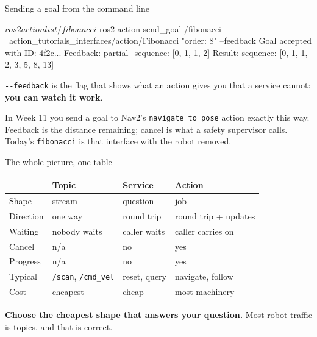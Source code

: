 \documentclass[aspectratio=169]{beamer}
\begin{document}
\begin{frame}[fragile]{Sending a goal from the command line}
  \begin{shells}
$ ros2 action list
/fibonacci
$ ros2 action send_goal /fibonacci \
      action_tutorials_interfaces/action/Fibonacci "{order: 8}" --feedback
Goal accepted with ID: 4f2c...
Feedback: partial_sequence: [0, 1, 1, 2]
Result: sequence: [0, 1, 1, 2, 3, 5, 8, 13]
  \end{shells}

  \footnotesize
  \texttt{-{}-feedback} is the flag that shows what an action gives you that a service cannot:
  \textbf{you can watch it work}.

  \begin{inthefield}
    \footnotesize
    In Week 11 you send a goal to Nav2's \texttt{navigate\_to\_pose} action exactly this way.
    Feedback is the distance remaining; cancel is what a safety supervisor calls. Today's
    \texttt{fibonacci} is that interface with the robot removed.
  \end{inthefield}
\end{frame}

\begin{frame}{The whole picture, one table}
  \small
  \begin{center}
  \begin{tabular}{@{}p{1.7cm}p{2.4cm}p{2.4cm}p{3.6cm}@{}}
    \toprule
    & \textbf{Topic} & \textbf{Service} & \textbf{Action} \\
    \midrule
    Shape & stream & question & job \\[0.25em]
    Direction & one way & round trip & round trip + updates \\[0.25em]
    Waiting & nobody waits & caller waits & caller carries on \\[0.25em]
    Cancel & n/a & no & yes \\[0.25em]
    Progress & n/a & no & yes \\[0.25em]
    Typical & \texttt{/scan}, \texttt{/cmd\_vel} & reset, query & navigate, follow \\[0.25em]
    Cost & cheapest & cheap & most machinery \\
    \bottomrule
  \end{tabular}
  \end{center}

  \vspace{0.5em}
  \centering
  \textbf{Choose the cheapest shape that answers your question.} Most robot traffic is topics,
  and that is correct.
\end{frame}
\end{document}
